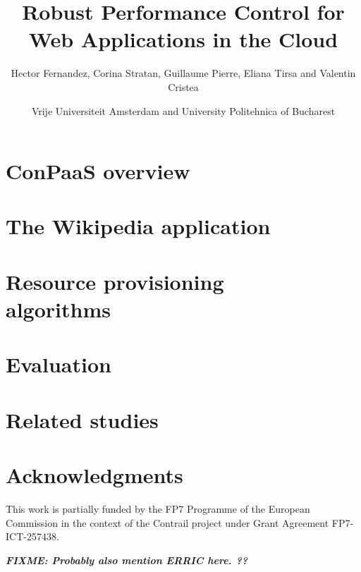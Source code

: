 \documentclass[10pt,twocolumn]{article}
\newcommand{\fixme}[1]
{
  \noindent
  \begin{boxedminipage}{\linewidth}
    \textsl{{\bf FIXME: #1}}
  \end{boxedminipage}
}
\begin{document}
\begin{multicols}{2}
\title{Robust Performance Control for Web Applications in the Cloud}
\author{Hector Fernandez, Corina Stratan, Guillaume Pierre, Eliana Tirsa and Valentin Cristea} 
\date{Vrije Universiteit Amsterdam and University Politehnica of Bucharest}
\maketitle
\end{multicols}




\section*{ConPaaS overview \label{conpaas}}



\section*{The Wikipedia application \label{wikipedia}}



\section*{Resource provisioning \\algorithms \label{provisioning}}



\section*{Evaluation \label{experiments}}



\section*{Related studies \label{studies}}







\section*{Acknowledgments}

This work is partially funded by the FP7 Programme of the European
Commission in the context of the Contrail project under Grant
Agreement FP7-ICT-257438.

\fixme{Probably also mention ERRIC here. ??}




\end{document}

